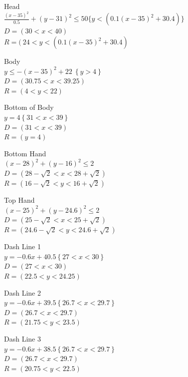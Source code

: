 \documentclass[12pt]{article}
\begin{document}
\begin{center}
{Head\\
$\frac{(x-35)^2}{0.5}+(y-31)^2 \leq 50 \{y < (0.1(x-35)^2+30.4)\}$\\
$D = (30 < x < 40)$\\
$R = (~24 < y < (0.1(x-35)^2+30.4)$\\
\bigbreak

Body\\
$y\le-\left(x-35\right)^2+22\ \left\{y>4\right\}$\\
$D = (30.75 < x < 39.25)$\\
$R = (4 < y < 22)$\\
\bigbreak

Bottom of Body\\
$y=4\left\{31<x<39\right\}$\\
$D = (31<x<39)$\\
$R = (y = 4)$\\
\bigbreak

Bottom Hand\\
$\left(x-28\right)^2+\left(y-16\right)^2\le2$\\
$D = (28 - \sqrt{2} < x < 28 + \sqrt{2})$\\
$R = (16 - \sqrt{2} < y < 16 + \sqrt{2})$\\
\bigbreak

Top Hand\\
$\left(x-25\right)^2+\left(y-24.6\right)^2\le2$\\
$D = (25 - \sqrt{2} < x < 25 + \sqrt{2})$\\
$R = (24.6 - \sqrt{2} < y < 24.6 + \sqrt{2})$\\
\bigbreak

Dash Line 1\\
$y=-0.6x+40.5\left\{27<x<30\right\}$\\
$D = (27 < x < 30)$\\
$R = (22.5 < y < 24.25)$\\
\bigbreak

Dash Line 2\\
$y=-0.6x+39.5\left\{26.7<x<29.7\right\}$\\
$D = (26.7 < x < 29.7)$\\
$R = (21.75 < y < 23.5)$\\ 
\bigbreak

Dash Line 3\\
$y=-0.6x+38.5\left\{26.7<x<29.7\right\}$\\
$D = (26.7 < x < 29.7)$\\
$R = (20.75 < y < 22.5)$\\
\bigbreak
}

\end{center}
\clearpage
\end{document}
